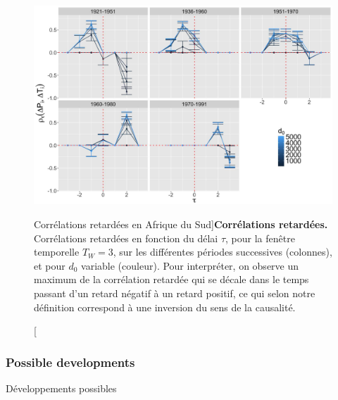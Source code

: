 \begin{figure}
\includegraphics[width=\linewidth]{Figures/Final/4-2-3-fig-causalityregimes-sudafcorrs.jpg}
\caption[Lagged correlations in South Africa][Corrélations retardées en Afrique du Sud]{\label{fig:causalityregimes:sudafcorrs}}{\textbf{Corrélations retardées.}  Corrélations retardées en fonction du délai $\tau$, pour la fenêtre temporelle $T_W=3$, sur les différentes périodes successives (colonnes), et pour $d_0$ variable (couleur). Pour interpréter, on observe un maximum de la corrélation retardée qui se décale dans le temps passant d'un retard négatif à un retard positif, ce qui selon notre définition correspond à une inversion du sens de la causalité.\label{fig:causalityregimes:sudafcorrs}}
\end{figure}



\subsubsection{Possible developments}{Développements possibles}

